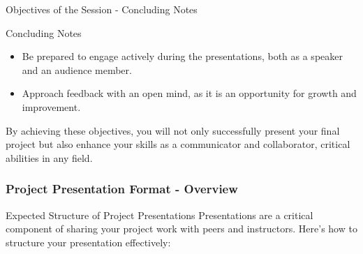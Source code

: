 \documentclass[aspectratio=169]{beamer}
\begin{document}
\begin{frame}[fragile]{Objectives of the Session - Concluding Notes}
    \begin{block}{Concluding Notes}
        \begin{itemize}
            \item Be prepared to engage actively during the presentations, both as a speaker and an audience member.
            \item Approach feedback with an open mind, as it is an opportunity for growth and improvement.
        \end{itemize}
    \end{block}

    By achieving these objectives, you will not only successfully present your final project but also enhance your skills as a communicator and collaborator, critical abilities in any field.
\end{frame}

\begin{frame}[fragile]
    \frametitle{Project Presentation Format - Overview}
    \begin{block}{Expected Structure of Project Presentations}
        Presentations are a critical component of sharing your project work with peers and instructors. Here’s how to structure your presentation effectively:
    \end{block}
\end{frame}
\end{document}
